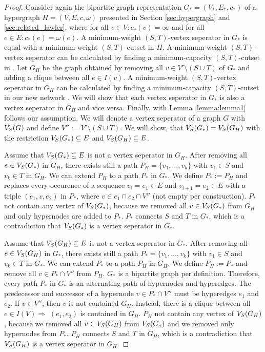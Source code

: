 \begin{proof}

Consider again the bipartite graph representation $G_* = (V_*,E_*,c_*)$ 
of a hypergraph $H = (V,E,c,\omega)$ presented in Section \ref{sec:hypergraph} and \ref{sec:related_lawler}, 
where for all $v \in V: c_*(v) = \infty$ and for all $e \in E: c_*(e) = 
\omega(e)$. A minimum-weight $(S,T)$-vertex seperator in $G_*$ is equal
with a minimum-weight $(S,T)$-cutset in $H$. A minimum-weight $(S,T)$-vertex seperator can be calculated
by finding a minimum-capacity $(S,T)$-cutset in . Let $G_H$ be the graph obtained by removing
all $v \in V'\setminus (S \cup T)$ of $G_*$ and adding a clique between all $e \in I(v)$. 
A minimum-weight $(S,T)$-vertex seperator in $G_H$ can be calculated by finding a 
minimum-capacity $(S,T)$-cutset in our new network .
We will show that each vertex seperator in $G_*$ is also a vertex seperator in $G_H$ and
vice versa. Finally, with Lemma \ref{lemma:lemma1} follows our assumption. We will 
denote a vertex seperator of a graph $G$ with $V_S(G)$ and define $V'' := V' \setminus (S \cup T)$. 
We will show, that $V_S(G_*) = V_S(G_H)$ with the restriction $V_S(G_*) \subseteq E$ and
$V_S(G_H) \subseteq E$.

Assume that $V_S(G_*) \subseteq E$ is not a vertex seperator in $G_H$. After removing all $e \in V_S(G_*)$ in
$G_H$, there exists still a path $P_H = \{v_1, \ldots, v_k\}$ with $v_1 \in S$ and
$v_k \in T$ in $G_H$. We can extend $P_H$ to a path $P_*$ in $G_*$.
We define $P_* := P_H$ and replaces every occurence of a sequence $v_i = e_1 \in E$ and
$v_{i+1} = e_2 \in E$ with a triple $(e_1,v,e_2)$ in $P_*$, where $v \in e_1 \cap e_2 \cap V''$
(not empty per construction). $P_*$ not contain any vertex of $V_S(G_*)$, because
we removed all $v \in V_S(G_*)$ from $G_H$ and only hypernodes are added to $P_*$. $P_*$ connects $S$ and 
$T$ in $G_*$, which is a contradiction that $V_S(G_*)$ is a vertex seperator in $G_*$.

Assume that $V_S(G_H) \subseteq E$ is not a vertex seperator in $G_*$. After removing all $e \in V_S(G_H)$ in
$G_*$, there exists still a path $P_* = \{v_1, \ldots, v_k\}$ with $v_1 \in S$ and
$v_k \in T$ in $G_*$. We can extend $P_*$ to a path $P_H$ in $G_H$.
We define $P_H := P_*$ and remove all $v \in P_* \cap V''$ from $P_H$. $G_*$ is a bipartite
graph per definition. Therefore, every path $P_*$ in $G_*$ is an alternating path of hypernodes and
hyperedges. The predecessor and successor of a hypernode $v \in P_* \cap V''$ must be hyperedges
$e_1$ and $e_2$. If $v \in V''$, then $v$ is not contained $G_H$. Instead, there is
a clique between all $e \in I(V) \Rightarrow$ $(e_1,e_2)$ is contained in $G_H$.
$P_H$ not contain any vertex of $V_S(G_H)$, because we removed all $v \in V_S(G_H)$ from $V_S(G_*)$ 
and we removed only hypernodes from $P_*$. $P_H$ connects $S$ and $T$ in $G_H$, which is a contradiction 
that $V_S(G_H)$ is a vertex seperator in $G_H$.


\end{proof}
